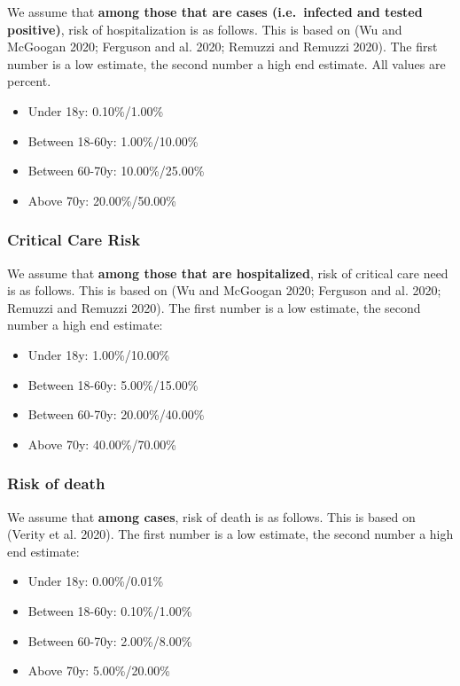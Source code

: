 \documentclass[
]{article}
\providecommand{\tightlist}{%
  \setlength{\itemsep}{0pt}\setlength{\parskip}{0pt}}
\begin{document}
We assume that \textbf{among those that are cases (i.e.~infected and
tested positive)}, risk of hospitalization is as follows. This is based
on (Wu and McGoogan 2020; Ferguson and al. 2020; Remuzzi and Remuzzi
2020). The first number is a low estimate, the second number a high end
estimate. All values are percent.

\begin{itemize}
\tightlist
\item
  Under 18y: 0.10\%/1.00\%
\item
  Between 18-60y: 1.00\%/10.00\%
\item
  Between 60-70y: 10.00\%/25.00\%
\item
  Above 70y: 20.00\%/50.00\%
\end{itemize}

\hypertarget{critical-care-risk}{%
\subsubsection{Critical Care Risk}\label{critical-care-risk}}

We assume that \textbf{among those that are hospitalized}, risk of
critical care need is as follows. This is based on (Wu and McGoogan
2020; Ferguson and al. 2020; Remuzzi and Remuzzi 2020). The first number
is a low estimate, the second number a high end estimate:

\begin{itemize}
\tightlist
\item
  Under 18y: 1.00\%/10.00\%
\item
  Between 18-60y: 5.00\%/15.00\%
\item
  Between 60-70y: 20.00\%/40.00\%
\item
  Above 70y: 40.00\%/70.00\%
\end{itemize}

\hypertarget{risk-of-death}{%
\subsubsection{Risk of death}\label{risk-of-death}}

We assume that \textbf{among cases}, risk of death is as follows. This
is based on (Verity et al. 2020). The first number is a low estimate,
the second number a high end estimate:

\begin{itemize}
\tightlist
\item
  Under 18y: 0.00\%/0.01\%
\item
  Between 18-60y: 0.10\%/1.00\%
\item
  Between 60-70y: 2.00\%/8.00\%
\item
  Above 70y: 5.00\%/20.00\%
\end{itemize}
\end{document}
